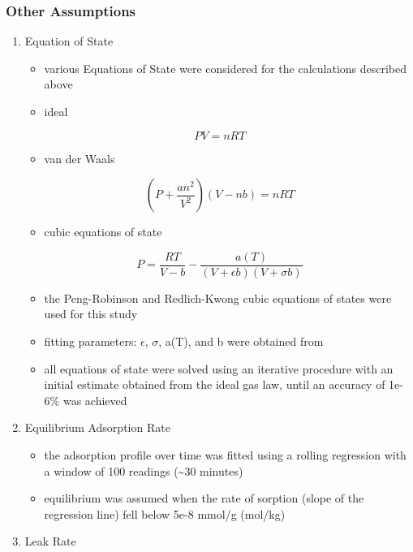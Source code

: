 \documentclass[11pt]{article}
\begin{document}
\subsubsection{Other Assumptions}
\label{sec:org97a256f}
\begin{enumerate}
\item Equation of State
\label{sec:orgae3e73c}
\begin{itemize}
\item various Equations of State were considered for the calculations described above
\item ideal
\end{itemize}
\begin{equation}
PV = nRT
\end{equation}
\begin{itemize}
\item van der Waals
\end{itemize}
\begin{equation}
(P + \frac{an^2}{V^2})(V-nb) = nRT
\end{equation}
\begin{itemize}
\item cubic equations of state
\end{itemize}
\begin{equation}
P = \frac{RT}{V-b} - \frac{a(T)}{(V+\epsilon b)(V+\sigma b)}
\end{equation}
\begin{itemize}
\item the Peng-Robinson and Redlich-Kwong cubic equations of states were used for this study
\item fitting parameters: \(\epsilon\), \(\sigma\), a(T), and b were obtained from \cite{Perry1950}
\item all equations of state were solved using an iterative procedure with an initial estimate obtained from the ideal gas law, until an accuracy of 1e-6\% was achieved
\end{itemize}
\item Equilibrium Adsorption Rate
\label{sec:orgd9ab0d9}
\begin{itemize}
\item the adsorption profile over time was fitted using a rolling regression with a window of 100 readings (\textasciitilde{}30 minutes)
\item equilibrium was assumed when the rate of sorption (slope of the regression line) fell below 5e-8 mmol/g (mol/kg)
\end{itemize}
\item Leak Rate

\end{enumerate}
\end{document}
